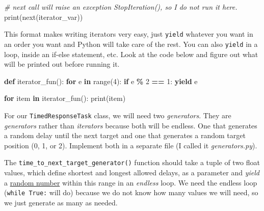 \documentclass[
]{book}
\newenvironment{Shaded}{\begin{snugshade}}{\end{snugshade}}
\newcommand{\BuiltInTok}[1]{#1}
\newcommand{\CommentTok}[1]{\textcolor[rgb]{0.56,0.35,0.01}{\textit{#1}}}
\newcommand{\ControlFlowTok}[1]{\textcolor[rgb]{0.13,0.29,0.53}{\textbf{#1}}}
\newcommand{\DecValTok}[1]{\textcolor[rgb]{0.00,0.00,0.81}{#1}}
\newcommand{\KeywordTok}[1]{\textcolor[rgb]{0.13,0.29,0.53}{\textbf{#1}}}
\newcommand{\NormalTok}[1]{#1}
\newcommand{\OperatorTok}[1]{\textcolor[rgb]{0.81,0.36,0.00}{\textbf{#1}}}
\begin{document}
\begin{Shaded}
\begin{Highlighting}[]
\CommentTok{\# next call will raise an exception StopIteration(), so I do not run it here.}
\BuiltInTok{print}\NormalTok{(}\BuiltInTok{next}\NormalTok{(iterator\_var))}
\end{Highlighting}
\end{Shaded}

This format makes writing iterators very easy, just \texttt{yield} whatever you want in an order you want and Python will take care of the rest. You can also \texttt{yield} in a loop, inside an if-else statement, etc. Look at the code below and figure out what will be printed out before running it.

\begin{Shaded}
\begin{Highlighting}[]
\KeywordTok{def}\NormalTok{ iterator\_fun():}
  \ControlFlowTok{for}\NormalTok{ e }\KeywordTok{in} \BuiltInTok{range}\NormalTok{(}\DecValTok{4}\NormalTok{):}
    \ControlFlowTok{if}\NormalTok{ e }\OperatorTok{\%} \DecValTok{2} \OperatorTok{==} \DecValTok{1}\NormalTok{:}
      \ControlFlowTok{yield}\NormalTok{ e}

\ControlFlowTok{for}\NormalTok{ item }\KeywordTok{in}\NormalTok{ iterator\_fun():}
  \BuiltInTok{print}\NormalTok{(item)}
\end{Highlighting}
\end{Shaded}

For our \texttt{TimedResponseTask} class, we will need two \emph{generators}. They are \emph{generators} rather than \emph{iterators} because both will be endless. One that generates a random delay until the next target and one that generates a random target position (0, 1, or 2). Implement both in a separate file (I called it \emph{generators.py}).

The \texttt{time\_to\_next\_target\_generator()} function should take a tuple of two float values, which define shortest and longest allowed delays, as a parameter and \emph{yield} a \href{https://docs.python.org/3/library/random.html\#random.uniform}{random number} within this range in an \emph{endless} loop. We need the endless loop (\texttt{while\ True:} will do) because we do not know how many values we will need, so we just generate as many as needed.
\end{document}
